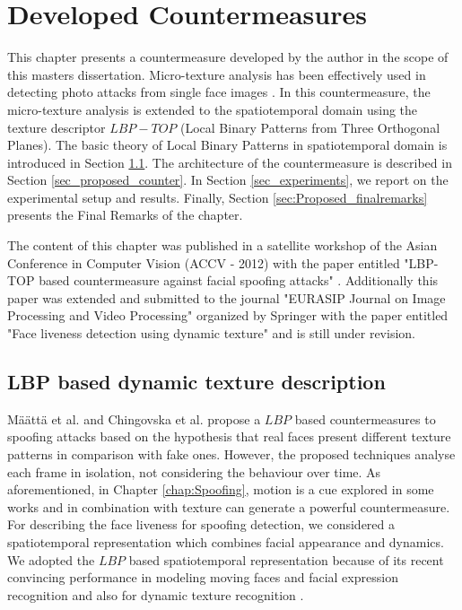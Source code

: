 \chapter{Developed Countermeasures}
\label{chap:Proposed_Countermeasures}

This chapter presents a countermeasure developed by the author in the scope of this masters dissertation. Micro-texture analysis has been effectively used in detecting photo attacks from single face images \cite{bai2010physics,maatta2011face,ChingovskaBIOSIG2012}. In this countermeasure, the micro-texture analysis is extended to the spatiotemporal domain using the texture descriptor $LBP-TOP$ (Local Binary Patterns from Three Orthogonal Planes). The basic theory of Local Binary Patterns in spatiotemporal domain is introduced in Section \ref{sec_dynamic}. The architecture of the countermeasure is described in Section \ref{sec_proposed_counter}. In Section \ref{sec_experiments}, we report on the experimental setup and results. Finally, Section \ref{sec:Proposed_finalremarks} presents the Final Remarks of the chapter.

The content of this chapter was published in a satellite workshop of the Asian Conference in Computer Vision (ACCV - 2012) with the paper entitled "LBP-TOP based countermeasure against facial spoofing attacks" \cite{Pereira_LBP_2012}. Additionally this paper was extended and submitted to the journal "EURASIP Journal on Image Processing and Video Processing" organized by Springer with the paper entitled "Face liveness detection using dynamic texture" and is still under revision.

\section{LBP based dynamic texture description}
\label{sec_dynamic}

M\"{a}\"{a}tt\"{a} et al. \cite{maatta2011face} and Chingovska et al. \cite{ChingovskaBIOSIG2012} propose a $LBP$ based countermeasures to spoofing attacks based on the hypothesis that real faces  present different texture patterns in comparison with fake ones. However, the proposed techniques analyse each frame in isolation, not considering the behaviour over time. As aforementioned, in Chapter \ref{chap:Spoofing}, motion is a cue explored in some works and in combination with texture can generate a powerful countermeasure. For describing the face liveness for spoofing detection, we considered a spatiotemporal representation which combines facial appearance and dynamics. We adopted the $LBP$ based spatiotemporal representation because of its recent convincing performance in modeling moving faces and facial expression recognition and also for dynamic texture recognition \cite{inen2011computer}. 

